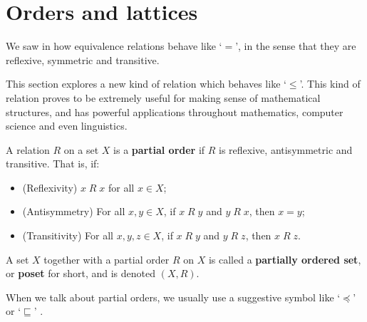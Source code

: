 \section{Orders and lattices}
\label{secOrderRelations}
\label{secPosets}
\label{secOrdersLattices}

We saw in  how equivalence relations behave like `$=$', in the sense that they are reflexive, symmetric and transitive. 

This section explores a new kind of relation which behaves like `$\le$'. This kind of relation proves to be extremely useful for making sense of mathematical structures, and has powerful applications throughout mathematics, computer science and even linguistics.

\begin{definition}
\label{defPartialOrder}
A relation $R$ on a set $X$ is a \textbf{partial order} if $R$ is reflexive, antisymmetric and transitive. That is, if:
\begin{itemize}
\item (Reflexivity) $x\; R\; x$ for all $x \in X$;
\item (Antisymmetry) For all $x,y \in X$, if $x\; R\; y$ and $y\; R\; x$, then $x=y$;
\item (Transitivity) For all $x,y,z \in X$, if $x\; R\; y$ and $y\; R\; z$, then $x\; R\; z$.
\end{itemize}
A set $X$ together with a partial order $R$ on $X$ is called a \textbf{partially ordered set}, or \textbf{poset} for short, and is denoted $(X,R)$.
\end{definition}

When we talk about partial orders, we usually use a suggestive symbol like `$\preceq$'  or `$\sqsubseteq$' .

